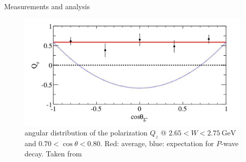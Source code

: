 \documentclass[11pt,aspectratio=1610,dvipsnames]{beamer}
\begin{document}
\begin{frame}{Measurements and analysis}
	\begin{figure}
		\centering
		\includegraphics[width=\linewidth]{angular_pol}
		\caption{angular distribution of the polarization $Q_z$ @ $2.65<W<\SI{2.75}{\giga\eV}$ and $0.70<\cos\theta<0.80$. Red: average, blue: expectation for $P$-wave decay. Taken from \citet{spinparity}}
	\end{figure}
	
\end{frame}
\end{document}
